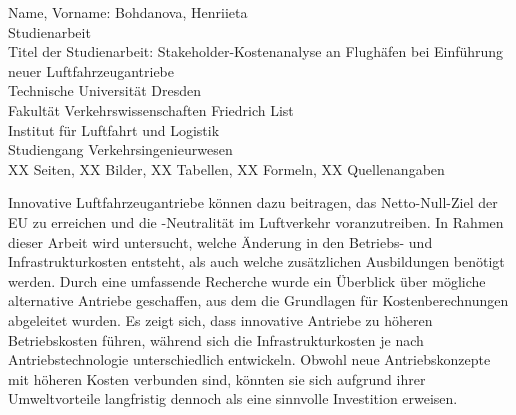 \newpage
\thispagestyle{empty}
\begin{minipage}[\textheight]{145mm}

\vspace{10mm}

Name, Vorname: Bohdanova, Henriieta\\
Studienarbeit\\

Titel der Studienarbeit: Stakeholder-Kostenanalyse an Flughäfen bei Einführung neuer Luftfahrzeugantriebe\\

Technische Universität Dresden\\
Fakultät Verkehrswissenschaften \glqq Friedrich List\grqq{}\\
Institut für Luftfahrt und Logistik\\

Studiengang Verkehrsingenieurwesen\\
XX Seiten, XX Bilder, XX Tabellen, XX Formeln, XX Quellenangaben 
		
\vspace{15mm}

\begin{minipage}[\textheight]{145mm}
 
\vspace{10mm}

 
Innovative Luftfahrzeugantriebe können dazu beitragen, das Netto-Null-Ziel der EU zu erreichen und die -Neutralität im Luftverkehr voranzutreiben.
In Rahmen dieser Arbeit wird untersucht, welche Änderung in den Betriebs- und Infrastrukturkosten entsteht, 
als auch welche zusätzlichen Ausbildungen benötigt werden. Durch eine umfassende Recherche wurde ein Überblick über mögliche alternative Antriebe geschaffen, aus dem die Grundlagen für Kostenberechnungen abgeleitet wurden.
Es zeigt sich, dass innovative Antriebe zu höheren Betriebskosten führen, während sich die Infrastrukturkosten je nach Antriebstechnologie unterschiedlich entwickeln.
Obwohl neue Antriebskonzepte mit höheren Kosten verbunden sind, könnten sie sich aufgrund ihrer Umweltvorteile 
langfristig dennoch als eine sinnvolle Investition erweisen.


 
\end{minipage}\hspace{4cm}



\end{minipage}
\cleardoublepage
